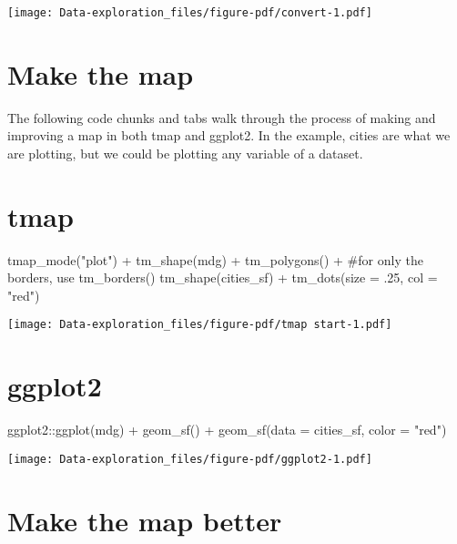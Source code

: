 \documentclass[
  letterpaper,
  DIV=11,
  numbers=noendperiod]{scrreprt}
\newenvironment{Shaded}{\begin{snugshade}}{\end{snugshade}}
\newcommand{\AttributeTok}[1]{\textcolor[rgb]{0.40,0.45,0.13}{#1}}
\newcommand{\CommentTok}[1]{\textcolor[rgb]{0.37,0.37,0.37}{#1}}
\newcommand{\DecValTok}[1]{\textcolor[rgb]{0.68,0.00,0.00}{#1}}
\newcommand{\FunctionTok}[1]{\textcolor[rgb]{0.28,0.35,0.67}{#1}}
\newcommand{\NormalTok}[1]{\textcolor[rgb]{0.00,0.23,0.31}{#1}}
\newcommand{\SpecialCharTok}[1]{\textcolor[rgb]{0.37,0.37,0.37}{#1}}
\newcommand{\StringTok}[1]{\textcolor[rgb]{0.13,0.47,0.30}{#1}}
\begin{document}
\texttt{[image: Data-exploration\_files/figure-pdf/convert-1.pdf]}

\section{Make the map}\label{make-the-map}

The following code chunks and tabs walk through the process of making
and improving a map in both tmap and ggplot2. In the example, cities are
what we are plotting, but we could be plotting any variable of a
dataset.

\section{tmap}

\begin{Shaded}
\begin{Highlighting}[]
\FunctionTok{tmap\_mode}\NormalTok{(}\StringTok{"plot"}\NormalTok{) }\SpecialCharTok{+}
  \FunctionTok{tm\_shape}\NormalTok{(mdg) }\SpecialCharTok{+}
  \FunctionTok{tm\_polygons}\NormalTok{() }\SpecialCharTok{+} \CommentTok{\#for only the borders, use tm\_borders()}
  \FunctionTok{tm\_shape}\NormalTok{(cities\_sf) }\SpecialCharTok{+}
  \FunctionTok{tm\_dots}\NormalTok{(}\AttributeTok{size =}\NormalTok{ .}\DecValTok{25}\NormalTok{, }\AttributeTok{col =} \StringTok{"red"}\NormalTok{)}
\end{Highlighting}
\end{Shaded}

\texttt{[image: Data-exploration\_files/figure-pdf/tmap start-1.pdf]}

\section{ggplot2}

\begin{Shaded}
\begin{Highlighting}[]
\NormalTok{ggplot2}\SpecialCharTok{::}\FunctionTok{ggplot}\NormalTok{(mdg) }\SpecialCharTok{+}
  \FunctionTok{geom\_sf}\NormalTok{() }\SpecialCharTok{+}
  \FunctionTok{geom\_sf}\NormalTok{(}\AttributeTok{data =}\NormalTok{ cities\_sf, }\AttributeTok{color =} \StringTok{"red"}\NormalTok{)}
\end{Highlighting}
\end{Shaded}

\texttt{[image: Data-exploration\_files/figure-pdf/ggplot2-1.pdf]}

\section{Make the map better}\label{make-the-map-better}
\end{document}

